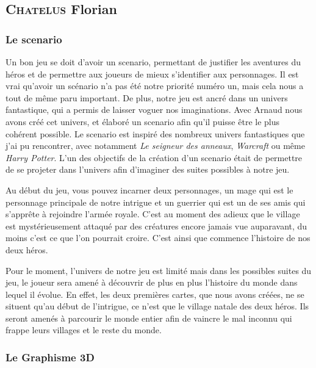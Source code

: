 \documentclass[a4paper, 12pt]{article}
\begin{document}
	\subsection{\textsc{Chatelus} Florian}
		\subsubsection{Le scenario}
		Un bon jeu se doit d’avoir un scenario, permettant de justifier les aventures du héros et de permettre aux joueurs de mieux s’identifier aux personnages. Il est vrai qu’avoir un scénario n’a pas été notre priorité numéro un, mais cela nous a tout de même paru important. De plus, notre jeu est ancré dans un univers fantastique, qui a permis de laisser voguer nos imaginations. Avec Arnaud nous avons créé cet univers, et élaboré un scenario afin qu’il puisse être le plus cohérent possible. Le scenario est inspiré des nombreux univers fantastiques que j’ai pu rencontrer, avec notamment \textit{Le seigneur des anneaux}, \textit{Warcraft} ou même \textit{Harry Potter}. L’un des objectifs de la création d’un scenario était de permettre de se projeter dans l’univers afin d’imaginer des suites possibles à notre jeu.
\par Au début du jeu, vous pouvez incarner deux personnages, un mage qui est le personnage principale de notre intrigue et un guerrier qui est un de ses amis qui s’apprête à rejoindre l’armée royale. C’est au moment des adieux que le village est mystérieusement  attaqué par des créatures encore jamais vue auparavant, du moins c’est ce que l’on pourrait croire. C’est ainsi que commence l’histoire de nos deux héros.
\par Pour le moment, l’univers de notre jeu est limité mais dans les possibles suites du jeu, le joueur sera amené à découvrir de plus en plus l’histoire du monde dans lequel il évolue. En effet, les deux premières cartes, que nous avons créées, ne se situent qu’au début de l’intrigue, ce n’est que le village natale des deux héros. Ils seront amenés à parcourir le monde entier afin de vaincre le mal inconnu qui frappe leurs villages et le reste du monde.
		\subsubsection{Le Graphisme 3D}
		
\end{document}
